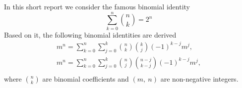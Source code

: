 In this short report we consider the famous binomial identity
\[
    \sum_{k=0}^{n}\binom{n}{k}=2^n
\]
Based on it, the following binomial identities are derived
\begin{gather*}
    m^n = \sum_{k=0}^{n} \sum_{j=0}^{k} \binom{n}{k} \binom{k}{j} (-1)^{k-j} m^j,\\
    m^n = \sum_{k=0}^{n} \sum_{j=0}^{k} \binom{n}{j} \binom{n-j}{k-j} (-1)^{k-j} m^j,\\
\end{gather*}
where $\binom{n}{k}$ are binomial coefficients and $(m, \ n)$ are non-negative integers.
